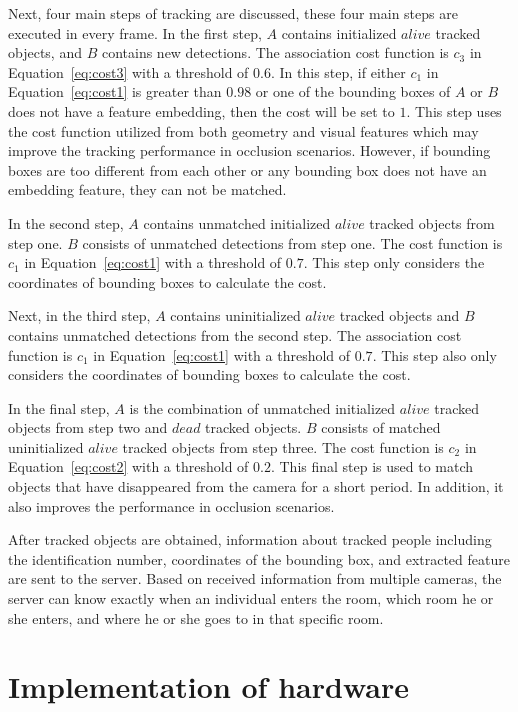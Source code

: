 \documentclass[../main.tex]{subfiles}
\begin{document}
Next, four main steps of tracking are discussed, these four main steps are executed in every frame. In the first step, $A$ contains initialized $alive$ tracked objects, and $B$ contains new detections. The association cost function is $c_3$ in Equation~\ref{eq:cost3} with a threshold of $0.6$. In this step, if either $c_1$ in Equation~\ref{eq:cost1} is greater than $0.98$ or one of the bounding boxes of $A$ or $B$ does not have a feature embedding, then the cost will be set to $1$. This step uses the cost function utilized from both geometry and visual features which may improve the tracking performance in occlusion scenarios. However, if bounding boxes are too different from each other or any bounding box does not have an embedding feature, they can not be matched.

In the second step, $A$ contains unmatched initialized $alive$ tracked objects from step one. $B$ consists of unmatched detections from step one. The cost function is $c_1$ in Equation~\ref{eq:cost1} with a threshold of $0.7$. This step only considers the coordinates of bounding boxes to calculate the cost.

Next, in the third step, $A$ contains uninitialized $alive$ tracked objects and $B$ contains unmatched detections from the second step. The association cost function is $c_1$ in Equation~\ref{eq:cost1} with a threshold of $0.7$. This step also only considers the coordinates of bounding boxes to calculate the cost.

In the final step, $A$ is the combination of unmatched initialized $alive$ tracked objects from step two and $dead$ tracked objects. $B$ consists of matched uninitialized $alive$ tracked objects from step three. The cost function is $c_2$ in Equation~\ref{eq:cost2} with a threshold of $0.2$. This final step is used to match objects that have disappeared from the camera for a short period. In addition, it also improves the performance in occlusion scenarios.

After tracked objects are obtained, information about tracked people including the identification number, coordinates of the bounding box, and extracted feature are sent to the server. Based on received information from multiple cameras, the server can know exactly when an individual enters the room, which room he or she enters, and where he or she goes to in that specific room.

\section{Implementation of hardware}
\label{sec:hardware}
\end{document}

